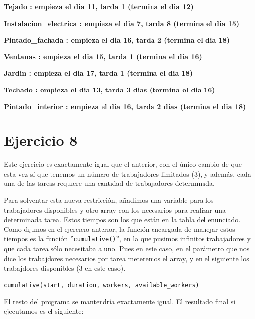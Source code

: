\documentclass[11pt,a4paper]{article}
\begin{document}
\textbf{Tejado : empieza el dia 11, tarda 1 (termina el dia 12)} \vspace{-8px}

\textbf{Instalacion\_electrica : empieza el dia 7, tarda 8 (termina el dia 15)} \vspace{-8px}

\textbf{Pintado\_fachada : empieza el dia 16, tarda 2 (termina el dia 18)} \vspace{-8px}

\textbf{Ventanas : empieza el dia 15, tarda 1 (termina el dia 16)} \vspace{-8px}

\textbf{Jardin : empieza el dia 17, tarda 1 (termina el dia 18)} \vspace{-8px}

\textbf{Techado : empieza el dia 13, tarda 3 dias (termina el dia 16)} \vspace{-8px}

\textbf{Pintado\_interior : empieza el dia 16, tarda 2 dias (termina el dia 18)} \vspace{-8px}



\section*{Ejercicio 8}
Este ejercicio es exactamente igual que el anterior, con el único cambio de que esta vez sí que tenemos un número de trabajadores limitados (3),
y además, cada una de las tareas requiere una cantidad de trabajadores determinada.

Para solventar esta nueva restricción, añadimos una variable para los trabajadores disponibles y otro array con los necesarios para realizar
una determinada tarea. Estos tiempos son los que están en la tabla del enunciado. Como dijimos en el ejercicio anterior, la función encargada
de manejar estos tiempos es la función ''\texttt{cumulative()}'', en la que pusimos infinitos trabajadores y que cada tarea sólo necesitaba
a uno. Pues en este caso, en el parámetro que nos dice los trabajdores necesarios por tarea meteremos el array, y en el siguiente los trabajdores
disponibles (3 en este caso).

\texttt{cumulative(start, duration, workers, available\_workers)}

El resto del programa se mantendría exactamente igual. El resultado final si ejecutamos es el siguiente:
\end{document}
